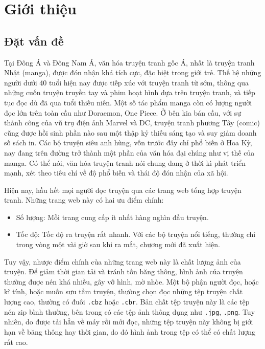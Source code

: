 \documentclass[../../thesis]{subfiles}
\begin{document}
\chapter{Giới thiệu}\label{chap:intro}


\section{Đặt vấn đề}\label{sec:background}

Tại Đông Á và Đông Nam Á, văn hóa truyện tranh gốc Á, nhất là truyện tranh Nhật
(manga), được đón nhận khá tích cực, đặc biệt trong giới trẻ. Thế hệ những người
dưới 40 tuổi hiện nay được tiếp xúc với truyện tranh từ sớm, thông qua những
cuốn truyện truyền tay và phim hoạt hình dựa trên truyện tranh, và tiếp tục đọc
dù đã qua tuổi thiếu niên. Một số tác phẩm manga còn có lượng người đọc lớn trên
toàn cầu như Doraemon, One Piece. Ở bên kia bán cầu, với sự thành công của vũ
trụ điện ảnh Marvel và DC, truyện tranh phương Tây (comic) cũng được hồi sinh
phần nào sau một thập kỷ thiếu sáng tạo và suy giảm doanh số sách in. Các bộ
truyện siêu anh hùng, vốn trước đây chỉ phổ biến ở Hoa Kỳ, nay đang trên đường
trở thành một phần của văn hóa đại chúng như vị thế của manga. Có thể nói, văn
hóa truyện tranh nói chung đang ở thời kì phát triển mạnh, xét theo tiêu chí về
độ phổ biến và thái độ đón nhận của xã hội.

Hiện nay, hầu hết mọi người đọc truyện qua các trang web tổng hợp truyện tranh.
Những trang web này có hai ưu điểm chính:

\begin{itemize}
    \item
        Số lượng: Mỗi trang cung cấp ít nhất hàng nghìn đầu truyện.
    \item
        Tốc độ: Tốc độ ra truyện rất nhanh. Với các bộ truyện nổi tiếng, thường
        chỉ trong vòng một vài giờ sau khi ra mắt, chương mới đã xuất hiện.
\end{itemize}

Tuy vậy, nhược điểm chính của những trang web này là chất lượng ảnh của truyện.
Để giảm thời gian tải và tránh tốn băng thông, hình ảnh của truyện thường được
nén khá nhiều, gây vỡ hình, mờ nhòe. Một bộ phận người đọc, hoặc kĩ tính, hoặc
muốn sưu tầm truyện, thường chọn đọc những tệp truyện chất lượng cao, thường có
đuôi \texttt{.cbz} hoặc \texttt{.cbr}. Bản chất tệp truyện này là các tệp nén
zip bình thường, bên trong có các tệp ảnh thông dụng như \texttt{.jpg},
\texttt{.png}. Tuy nhiên, do được tải hẳn về máy rồi mới đọc, những tệp truyện
này không bị giới hạn về băng thông hay thời gian, do đó hình ảnh trong tệp có
thể có chất lượng rất cao.
\end{document}
